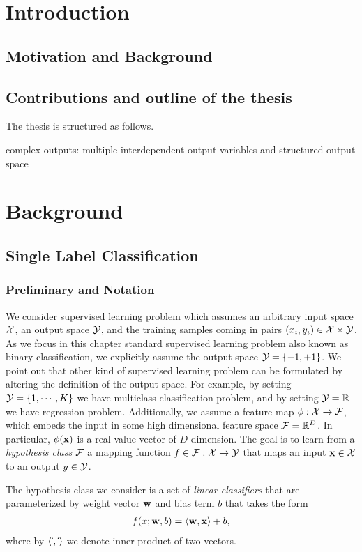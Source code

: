 


\chapter{Introduction}
\section{Motivation and Background}
\section{Contributions and outline of the thesis}

The thesis is structured as follows.


complex outputs: multiple interdependent output variables and structured output space


\chapter{Background}

\newpage
\section{Single Label Classification}

\subsection{Preliminary and Notation}
We consider supervised learning problem which assumes an arbitrary input space $\mathcal{X}$, an output space $\mathcal{Y}$, and the training samples coming in pairs $(x_i,y_i)\in\mathcal{X}\times\mathcal{Y}$.
As we focus in this chapter standard supervised learning problem also known as binary classification, we explicitly assume the output space $\mathcal{Y}=\{-1,+1\}$.
We point out that other kind of supervised learning problem can be formulated by altering the definition of the output space.
For example, by setting $\mathcal{Y}=\{1,\cdots,K\}$ we have multiclass classification problem, and by setting $\mathcal{Y}=\mathbb{R}$ we have regression problem.
Additionally, we assume a feature map $\mathbf{\phi}:\mathcal{X}\rightarrow\mathcal{F}$, which embeds the input in some high dimensional feature space $\mathcal{F}=\mathbb{R}^D$.
In particular, $\mathbf{\phi}(\mathbf {x})$ is a real value vector of $D$ dimension.
The goal is to learn from a \textit{hypothesis class} $\mathcal{F}$ a mapping function $f\in\mathcal{F}:\mathcal{X}\rightarrow\mathcal{Y}$  that maps an input $\mathbf {x}\in\mathcal{X}$ to an output $y\in\mathcal{Y}$. 

The hypothesis class we consider is a set of \textit{linear classifiers} that are parameterized by weight vector $\mathbf {w}$ and bias term $b$ that takes the form
\begin{align}
	f(x;\mathbf {w},b) = \langle \mathbf {w}, \mathbf {x} \rangle + b, \label{linearclassifier}
\end{align}
where by $\langle \dot\,, \dot\, \rangle$ we denote inner product of two vectors.

